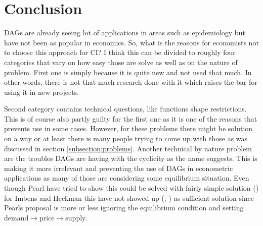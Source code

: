 \documentclass[main=english,12pt,a4paper,pdftex,econ,utf8]{aaltothesis}
\begin{document}
\clearpage

\section{Conclusion}

DAGs are already seeing lot of applications in areas such as epidemiology but have not been as popular in economics. So, what is the reasons for economists not to choose this approach for CI? I think this can be divided to roughly four categories that vary on how easy those are solve as well as on the nature of problem. First one is simply because it is quite new and not used that much. In other words, there is not that much research done with it which raises the bar for using it in new projects.

Second category contains technical questions, like functions shape restrictions. This is of course also partly guilty for the first one as it is one of the reasons that prevents use in some cases. However, for these problems there might be solution on a way or at least there is many people trying to come up with those as was discussed in section \ref{subsection:problems}. Another technical by nature problem are the troubles DAGs are having with the cyclicity as the name suggests. This is making it more irrelevant and preventing the use of DAGs in econometric applications as many of those are considering some equilibrium situation. Even though Pearl have tried to show this could be solved with fairly simple solution (\cite{PearlMackenzie18}) for Imbens and Heckman this have not showed up (\cite{imbes2020}; \cite{Heckman2015}) as sufficient solution since Pearls proposal is more or less ignoring the equilibrium condition and setting demand$\rightarrow$price$\rightarrow$supply.
\end{document}
